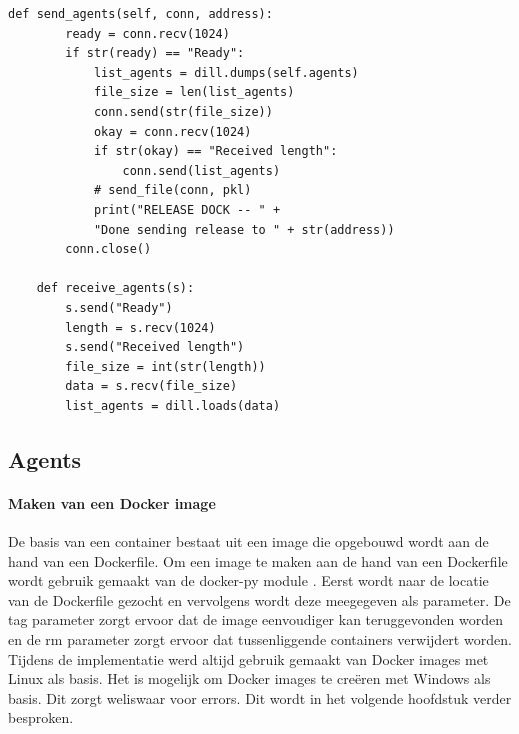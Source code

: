 \begin{minipage}{\linewidth}
\begin{center}
\begin{lstlisting}[captionpos=b,caption={Verzenden en ontvangen van agenten},label={list:serDeser}]
    def send_agents(self, conn, address):
        ready = conn.recv(1024)
        if str(ready) == "Ready":
            list_agents = dill.dumps(self.agents)
            file_size = len(list_agents)
            conn.send(str(file_size))
            okay = conn.recv(1024)
            if str(okay) == "Received length":
                conn.send(list_agents)
            # send_file(conn, pkl)
            print("RELEASE DOCK -- " +
            "Done sending release to " + str(address))
        conn.close()
        
    def receive_agents(s):        
        s.send("Ready")
        length = s.recv(1024)
        s.send("Received length")
        file_size = int(str(length))
        data = s.recv(file_size)
        list_agents = dill.loads(data)
\end{lstlisting}
\end{center}
\end{minipage}


\subsection{Agents}
\paragraph{Maken van een Docker image}\label{sec:agentImpl}
De basis van een container bestaat uit een image die opgebouwd wordt aan de hand van een Dockerfile.
Om een image te maken aan de hand van een Dockerfile wordt gebruik gemaakt van de docker-py module \citep{dockerPy}.
Eerst wordt naar de locatie van de Dockerfile gezocht en vervolgens wordt deze meegegeven als parameter.
De tag parameter zorgt ervoor dat de image eenvoudiger kan teruggevonden worden en de rm parameter zorgt ervoor dat tussenliggende containers verwijdert worden.
Tijdens de implementatie werd altijd gebruik gemaakt van Docker images met Linux als basis.
Het is mogelijk om Docker images te creëren met Windows als basis.
Dit zorgt weliswaar voor errors.
Dit wordt in het volgende hoofdstuk verder besproken.

